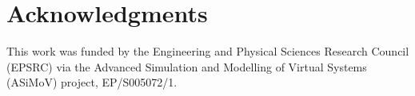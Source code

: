 \documentclass{svproc}
\begin{document}
\section*{Acknowledgments}
This work was funded by the Engineering and Physical Sciences Research Council (EPSRC) via the Advanced Simulation and Modelling of Virtual Systems (ASiMoV) project, EP/S005072/1.


\end{document}
